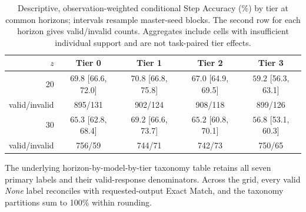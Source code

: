 \documentclass{article}
\begin{document}
\begin{table}[H]
\centering
\caption{Descriptive, observation-weighted conditional Step Accuracy (\%) by tier at common horizons; intervals resample master-seed blocks. The second row for each horizon gives valid/invalid counts. Aggregates include cells with insufficient individual support and are not task-paired tier effects.}
\label{tab:matched_horizon_tiers}
\scriptsize
\begin{tabular}{rcccc}
\toprule
$z$ & \textbf{Tier 0} & \textbf{Tier 1} & \textbf{Tier 2} & \textbf{Tier 3} \\
\midrule
20 & $69.8$ [66.6, 72.0] & $70.8$ [66.8, 75.8] & $67.0$ [64.9, 69.5] & $59.2$ [56.3, 63.1] \\
{\scriptsize valid/invalid} & 895/131 & 902/124 & 908/118 & 899/126 \\
30 & $65.3$ [62.8, 68.4] & $69.2$ [66.6, 73.7] & $65.2$ [60.8, 70.1] & $56.8$ [53.1, 60.3] \\
{\scriptsize valid/invalid} & 756/59 & 744/71 & 742/73 & 750/65 \\
\bottomrule
\end{tabular}
\end{table}

\begin{table}[H]
\centering
\caption{Corrected primary taxonomy proportions pooled over observed model--tier cells at two fully covered horizons. \emph{None} denotes requested-output Exact Match. Denominators include valid responses only; percentages are observation-weighted across the cohort, not model averages.}
\label{tab:matched_horizon_taxonomy}
\scriptsize
{}
\end{table}

The underlying horizon-by-model-by-tier taxonomy table retains all seven
primary labels and their valid-response denominators. Across the grid, every
valid \emph{None} label reconciles with requested-output Exact Match, and
the taxonomy partitions sum to 100\% within rounding.
\end{document}
